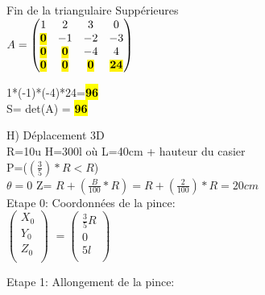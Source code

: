\vspace{5mm} %
Fin de la triangulaire Suppérieures \\

$
A =
\begin{pmatrix}
  1 & 2 & 3 & 0    \\
  \hl{\textbf{0}} & -1 & -2 & -3 \\
  \hl{\textbf{0}} & \hl{\textbf{0}} & -4 & 4   \\
  \hl{\textbf{0}} & \hl{\textbf{0}} & \hl{\textbf{0}} & \hl{\textbf{24}}  \\
\end{pmatrix}
$

\vspace{5mm} %

1*(-1)*(-4)*24=\hl{\textbf{96}} \\
\vspace{4mm} %
S= det(A) = \hl{\textbf{96}} \\


\vspace{15mm} %

H) Déplacement 3D \\

R=10u H=300l où L=40cm + hauteur du casier \\
P=($(\frac{3}{5})* R<R$) \\
$\theta =0$ Z= $R+(\frac{B}{100}*R) = R+(\frac{2}{100})*R=20cm $ \\

Etape 0: Coordonnées de la pince: \\

$
\begin{pmatrix}
  X_{0} \\
  Y_{0} \\
  Z_{0} \\
\end{pmatrix}
$
\vspace{5mm} %
$
=
\begin{pmatrix}
  \frac{3}{5}R \\
  0 \\
  5l \\
\end{pmatrix}
$

Etape 1: Allongement de la pince: \\

